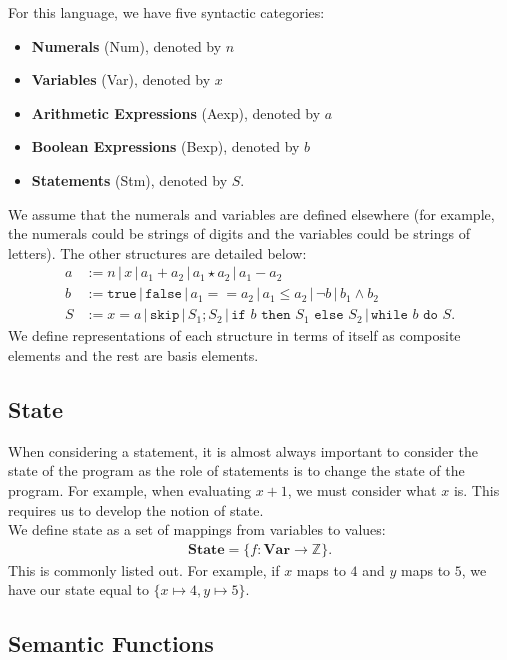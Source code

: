 \documentclass[a4paper, 12pt, twoside]{article}
\begin{document}
For this language, we have five syntactic categories: \begin{itemize}
  \item \textbf{Numerals} (Num), denoted by $n$
  \item \textbf{Variables} (Var), denoted by $x$
  \item \textbf{Arithmetic Expressions} (Aexp), denoted by $a$
  \item \textbf{Boolean Expressions} (Bexp), denoted by $b$
  \item \textbf{Statements} (Stm), denoted by $S$.
\end{itemize} We assume that the numerals and variables are defined
elsewhere (for example, the numerals could be strings of digits
and the variables could be strings of letters). The other
structures are detailed below: \begin{align*}
  a &:= n \, | \, x \, | \, a_1 + a_2 \, | \, a_1 \star a_2 \, | \, a_1 - a_2 \\
  b &:= \texttt{true} \, | \, \texttt{false} \, | \, a_1 == a_2 \, 
  | \, a_1 \leq a_2 \, | \, \neg b \, | \, b_1 \land b_2 \\
  S &:= x = a \, | \, \texttt{skip} \, | \, S_1 ; S_2 \, | \, \texttt{if }
  b \texttt{ then } S_1 \texttt{ else } S_2 \, | \, \texttt{while } 
  b \texttt{ do } S.
\end{align*} We define representations of each structure in terms of itself
as composite elements and the rest are basis elements.

\subsection{State}

When considering a statement, it is almost always important to consider the
state of the program as the role of statements is to change the state
of the program. For example, when evaluating $x + 1$, we must consider
what $x$ is. This requires us to develop the notion of state.
\\[\baselineskip]
We define state as a set of mappings from variables to values: \begin{gather*}
  \textbf{State} = \{f : \textbf{Var} \to \mathbb{Z}\}.
\end{gather*} This is commonly listed out. For example, if $x$ maps to $4$ and 
$y$ maps to $5$, we have our state equal to $\{x \mapsto 4, y \mapsto 5\}$. 

\subsection{Semantic Functions}
\end{document}

